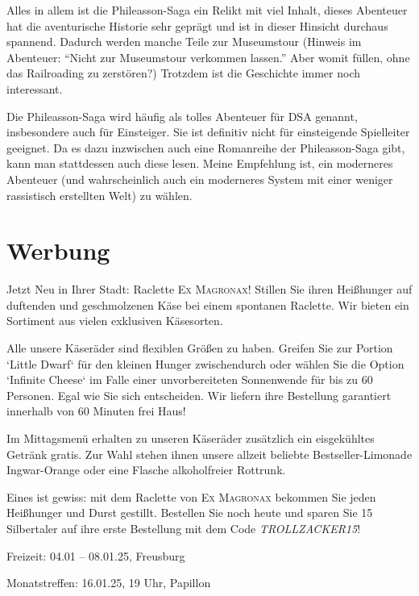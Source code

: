 \documentclass[final]{multiversum}
\begin{document}
Alles in allem ist die Phileasson-Saga ein Relikt mit viel Inhalt, dieses
Abenteuer hat die aventurische Historie sehr geprägt und ist in dieser Hinsicht
durchaus spannend. Dadurch werden manche Teile zur Museumstour (Hinweis im
Abenteuer: “Nicht zur Museumstour verkommen lassen.” Aber womit füllen, ohne das
Railroading zu zerstören?) Trotzdem ist die Geschichte immer noch interessant.

Die Phileasson-Saga wird häufig als tolles Abenteuer für DSA genannt,
insbesondere auch für Einsteiger. Sie ist definitiv nicht für einsteigende
Spielleiter geeignet. Da es dazu inzwischen auch eine Romanreihe der
Phileasson-Saga gibt, kann man stattdessen auch diese lesen. Meine Empfehlung
ist, ein moderneres Abenteuer (und wahrscheinlich auch ein moderneres System mit
einer weniger rassistisch erstellten Welt) zu wählen.

\section{Werbung}
Jetzt Neu in Ihrer Stadt: Raclette \textsc{Ex Magronax}! Stillen Sie ihren
Heißhunger auf duftenden und geschmolzenen Käse bei einem spontanen Raclette.
Wir bieten ein Sortiment aus vielen exklusiven Käsesorten.

Alle unsere Käseräder sind flexiblen Größen zu haben. Greifen Sie zur Portion
`Little Dwarf` für den kleinen Hunger zwischendurch oder wählen Sie die Option
`Infinite Cheese` im Falle einer unvorbereiteten Sonnenwende für bis zu 60
Personen. Egal wie Sie sich entscheiden. Wir liefern ihre Bestellung garantiert
innerhalb von 60 Minuten frei Haus!

Im Mittagsmenü erhalten zu unseren Käseräder zusätzlich ein eisgekühltes Getränk
gratis. Zur Wahl stehen ihnen unsere allzeit beliebte Bestseller-Limonade
Ingwar-Orange oder eine Flasche alkoholfreier Rottrunk.

Eines ist gewiss: mit dem Raclette von \textsc{Ex Magronax} bekommen Sie jeden
Heißhunger und Durst gestillt. Bestellen Sie noch heute und sparen Sie 15
Silbertaler auf ihre erste Bestellung mit dem Code \emph{TROLLZACKER15}!
\begin{termine}
  \item Freizeit: 04.01 -- 08.01.25, Freusburg
  \item Monatstreffen: 16.01.25, 19 Uhr, Papillon
\end{termine}
\impressum
\end{document}
